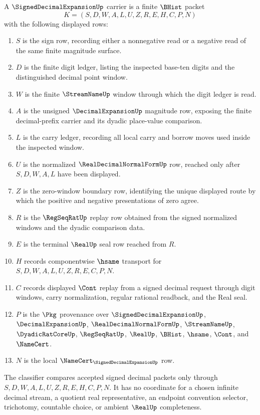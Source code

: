 \begin{definition}
\label{def:signed-decimal-expansion-carrier}
A $\SignedDecimalExpansionUp$ carrier is a finite $\BHist$ packet
$$
K=(S,D,W,A,L,U,Z,R,E,H,C,P,N)
$$
with the following displayed rows:
\begin{enumerate}
\item $S$ is the sign row, recording either a nonnegative read or a negative read of the same finite magnitude surface.
\item $D$ is the finite digit ledger, listing the inspected base-ten digits and the distinguished decimal point window.
\item $W$ is the finite $\StreamNameUp$ window through which the digit ledger is read.
\item $A$ is the unsigned $\DecimalExpansionUp$ magnitude row, exposing the finite decimal-prefix carrier and its dyadic place-value comparison.
\item $L$ is the carry ledger, recording all local carry and borrow moves used inside the inspected window.
\item $U$ is the normalized $\RealDecimalNormalFormUp$ row, reached only after $S,D,W,A,L$ have been displayed.
\item $Z$ is the zero-window boundary row, identifying the unique displayed route by which the positive and negative presentations of zero agree.
\item $R$ is the $\RegSeqRatUp$ replay row obtained from the signed normalized windows and the dyadic comparison data.
\item $E$ is the terminal $\RealUp$ seal row reached from $R$.
\item $H$ records componentwise $\hsame$ transport for $S,D,W,A,L,U,Z,R,E,C,P,N$.
\item $C$ records displayed $\Cont$ replay from a signed decimal request through digit windows, carry normalization, regular rational readback, and the Real seal.
\item $P$ is the $\Pkg$ provenance over $\SignedDecimalExpansionUp$, $\DecimalExpansionUp$, $\RealDecimalNormalFormUp$, $\StreamNameUp$, $\DyadicRatCoreUp$, $\RegSeqRatUp$, $\RealUp$, $\BHist$, $\hsame$, $\Cont$, and $\NameCert$.
\item $N$ is the local $\NameCert_{\SignedDecimalExpansionUp}$ row.
\end{enumerate}
The classifier compares accepted signed decimal packets only through $S,D,W,A,L,U,Z,R,E,H,C,P,N$. It has no coordinate for a chosen infinite decimal stream, a quotient real representative, an endpoint convention selector, trichotomy, countable choice, or ambient $\RealUp$ completeness.
\end{definition}

